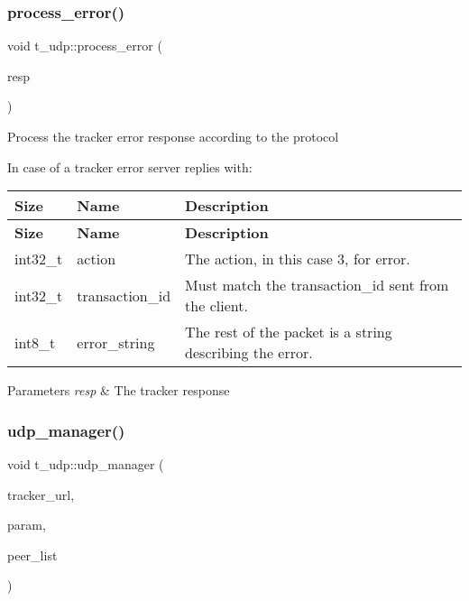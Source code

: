 \subsubsection{\texorpdfstring{process\+\_\+error()}{process\_error()}}
{\footnotesize\ttfamily void t\+\_\+udp\+::process\+\_\+error (\begin{DoxyParamCaption}\item[{std\+::vector$<$ uint8\+\_\+t $>$ \&}]{resp }\end{DoxyParamCaption})}

Process the tracker error response according to the protocol

In case of a tracker error server replies with\+:

\tabulinesep=1mm
\begin{longtabu} spread 0pt [c]{*{3}{|X[-1]}|}
\hline
\rowcolor{\tableheadbgcolor}\textbf{ Size }&\textbf{ Name }&\textbf{ Description  }\\
\endfirsthead
\hline
\endfoot
\hline
\rowcolor{\tableheadbgcolor}\textbf{ Size }&\textbf{ Name }&\textbf{ Description  }\\
\endhead
int32\+\_\+t &action &The action, in this case 3, for error. \\
int32\+\_\+t &transaction\+\_\+id &Must match the transaction\+\_\+id sent from the client. \\
int8\+\_\+t &error\+\_\+string &The rest of the packet is a string describing the error. \\
\end{longtabu}



\begin{DoxyParams}{Parameters}
{\em resp} & The tracker response \\
\hline
\end{DoxyParams}
\mbox{\label{namespacet__udp_af26a254f05566a7066b6930ad998a656}} 
\subsubsection{\texorpdfstring{udp\+\_\+manager()}{udp\_manager()}}
{\footnotesize\ttfamily void t\+\_\+udp\+::udp\+\_\+manager (\begin{DoxyParamCaption}\item[{const std\+::string}]{tracker\+\_\+url,  }\item[{\hyperlink{structtracker_1_1TParameter}{tracker\+::\+T\+Parameter}}]{param,  }\item[{\hyperlink{namespacepwp_ad07fa6df116b205302ad5ec172277184}{pwp\+::\+Peer\+List}}]{peer\+\_\+list }\end{DoxyParamCaption})}



